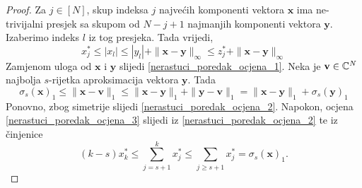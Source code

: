 \documentclass[a4paper,twoside,12pt]{memoir} %
\newcommand{\vect}[1]{\mathbf{#1}}
\renewcommand{\vec}{\vect}
\newcommand{\norm}[1]{\|{#1}\|}
\begin{document}
\begin{proof}
    Za $j \in [N]$, skup indeksa $j$ najve\'cih komponenti vektora $\vec{x}$ ima ne-trivijalni presjek sa skupom od $N-j+1$ najmanjih komponenti vektora $\vec{y}$. Izaberimo indeks $l$ iz tog presjeka. Tada vrijedi, 
    \begin{equation*}
        x_j^* \leq |x_l| \leq |y_l| + \norm{\vec{x} - \vec{y}}_{\infty} \leq z_j^* + \norm{\vec{x} - \vec{y}}_{\infty}
    \end{equation*}
    Zamjenom uloga od $\vec{x}$ i $\vec{y}$ slijedi \eqref{nerastuci_poredak_ocjena_1}.
    Neka je $\vec{v} \in \C^N$ najbolja $s$-rijetka aproksimacija vektora $\vec{y}$. Tada
    \begin{equation*}
        \sigma_s(\vec{x})_1 \leq \norm{\vec{x} - \vec{v}}_1 \leq \norm{\vec{x} - \vec{y}}_1 + \norm{\vec{y} - \vec{v}}_1 = \norm{\vec{x} - \vec{y}}_1 + \sigma_s(\vec{y})_1 
    \end{equation*}
    Ponovno, zbog simetrije slijedi \eqref{nerastuci_poredak_ocjena_2}. Napokon, ocjena \eqref{nerastuci_poredak_ocjena_3} slijedi iz \eqref{nerastuci_poredak_ocjena_2} te iz \v{c}injenice
    \begin{equation*}
        (k-s)x_k^* \leq \sum_{j=s+1}^{k}x_j^* \leq \sum_{j \geq s+1} x_j^* = \sigma_s(\vec{x})_1.
    \end{equation*}
\end{proof}
\end{document}
